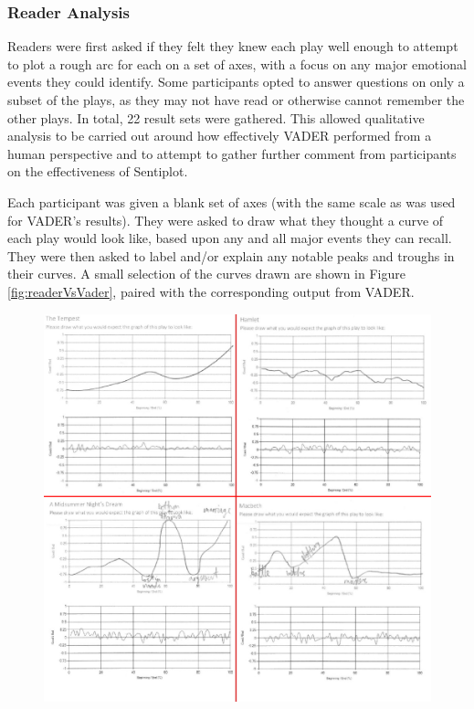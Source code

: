 \documentclass{article}
\begin{document}
{        \subsubsection{Reader Analysis}
            Readers were first asked if they felt they knew each play well enough to attempt to plot a rough arc for each on a set of axes, with a focus on any major emotional events they could identify. Some participants opted to answer questions on only a subset of the plays, as they may not have read or otherwise cannot remember the other plays. In total, 22 result sets were gathered. This allowed qualitative analysis to be carried out around how effectively VADER performed from a human perspective and to attempt to gather further comment from participants on the effectiveness of Sentiplot.

            Each participant was given a blank set of axes (with the same scale as was used for VADER's results). They were asked to draw what they thought a curve of each play would look like, based upon any and all major events they can recall. They were then asked to label and/or explain any notable peaks and troughs in their curves. A small selection of the curves drawn are shown in Figure \ref{fig:readerVsVader}, paired with the corresponding output from VADER.
            \begin{figure}[htbp]
                \includegraphics[width=1\textwidth]{Figures/Survey/readerVsVader}

\end{figure}}
\end{document}
